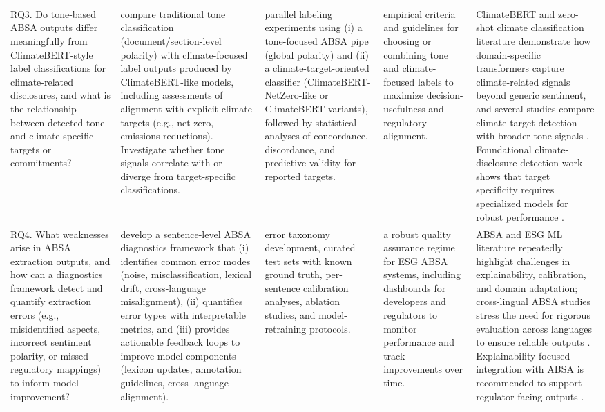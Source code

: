 \begin{landscape}
\begin{longtable}{p{6cm} p{6cm} p{4cm} p{3cm} p{6cm}}
\addlinespace
RQ3. Do tone-based ABSA outputs differ meaningfully from ClimateBERT-style label classifications for climate-related disclosures, and what is the relationship between detected tone and climate-specific targets or commitments? & compare traditional tone classification (document/section-level polarity) with climate-focused label outputs produced by ClimateBERT-like models, including assessments of alignment with explicit climate targets (e.g., net-zero, emissions reductions). Investigate whether tone signals correlate with or diverge from target-specific classifications. & parallel labeling experiments using (i) a tone-focused ABSA pipe (global polarity) and (ii) a climate-target-oriented classifier (ClimateBERT-NetZero-like or ClimateBERT variants), followed by statistical analyses of concordance, discordance, and predictive validity for reported targets. & empirical criteria and guidelines for choosing or combining tone and climate-focused labels to maximize decision-usefulness and regulatory alignment. & ClimateBERT and zero-shot climate classification literature demonstrate how domain-specific transformers capture climate-related signals beyond generic sentiment, and several studies compare climate-target detection with broader tone signals \cite{10.48550/arxiv.2510.01222,10.2139/ssrn.3796152,10.1371/journal.pone.0288052,10.1051/e3sconf/202343602004,10.1108/dta-01-2024-0065}. Foundational climate-disclosure detection work shows that target specificity requires specialized models for robust performance \cite{10.21203/rs.3.rs-3600821/v1,10.1111/1475-679x.12625,10.18653/v1/2023.emnlp-main.975}. \\
\addlinespace
RQ4. What weaknesses arise in ABSA extraction outputs, and how can a diagnostics framework detect and quantify extraction errors (e.g., misidentified aspects, incorrect sentiment polarity, or missed regulatory mappings) to inform model improvement? & develop a sentence-level ABSA diagnostics framework that (i) identifies common error modes (noise, misclassification, lexical drift, cross-language misalignment), (ii) quantifies error types with interpretable metrics, and (iii) provides actionable feedback loops to improve model components (lexicon updates, annotation guidelines, cross-language alignment). & error taxonomy development, curated test sets with known ground truth, per-sentence calibration analyses, ablation studies, and model-retraining protocols. & a robust quality assurance regime for ESG ABSA systems, including dashboards for developers and regulators to monitor performance and track improvements over time. & ABSA and ESG ML literature repeatedly highlight challenges in explainability, calibration, and domain adaptation; cross-lingual ABSA studies stress the need for rigorous evaluation across languages to ensure reliable outputs \cite{10.1002/csr.70089,10.2139/ssrn.3738629,10.1108/mf-01-2023-0020,10.1016/j.inffus.2025.103073,10.1111/eufm.12509,10.48550/arxiv.2511.00024,10.3390/math12193119}. Explainability-focused integration with ABSA is recommended to support regulator-facing outputs \cite{10.1002/csr.70089,10.2139/ssrn.3738629,10.1108/mf-01-2023-0020}. & \\

\end{longtable}
\end{landscape}
